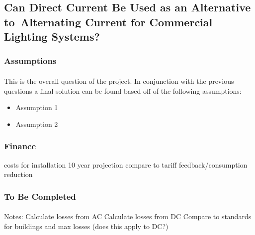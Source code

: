 \subsection{Can Direct Current Be Used as an Alternative to \,Alternating Current for Commercial Lighting Systems?}

\subsubsection{Assumptions}
\paragraph{}
This is the overall question of the project. In conjunction with the previous questions a final solution can be found based off of the following assumptions:

\begin{itemize}[noitemsep,nolistsep]
	\item Assumption 1
	\item Assumption 2
\end{itemize}

\subsubsection{Finance}
costs for installation
10 year projection
compare to tariff feedback/consumption reduction

\subsubsection{To Be Completed}
\paragraph{}
Notes:
\newline
Calculate losses from AC
Calculate losses from DC
Compare to standards for buildings and max losses (does this apply to DC?)